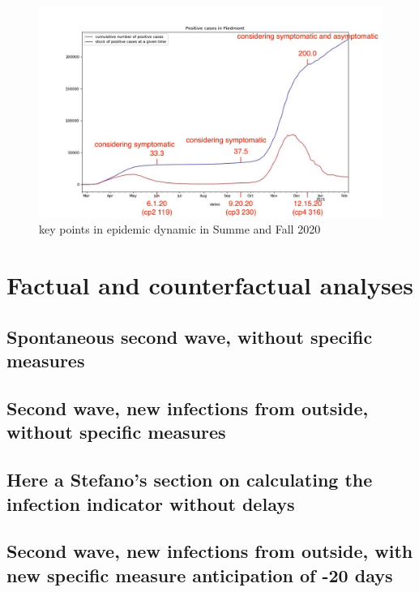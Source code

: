 \documentclass[graybox]{svmult}
\begin{document}
\begin{figure}[t]
\center
\includegraphics[scale=0.25]{andamento900annotato.jpg}
\caption{key points in epidemic dynamic in Summe and Fall 2020} 
\label{Key points}
\end{figure}


\section{Factual and counterfactual analyses}


\subsection{Spontaneous second wave, without specific measures}

\subsection{Second wave, new infections from outside, without specific measures}

\subsection{Here a Stefano's section on calculating the infection indicator without delays }

\subsection{Second wave, new infections from outside, with new specific measure anticipation of -20 days}
\end{document}
